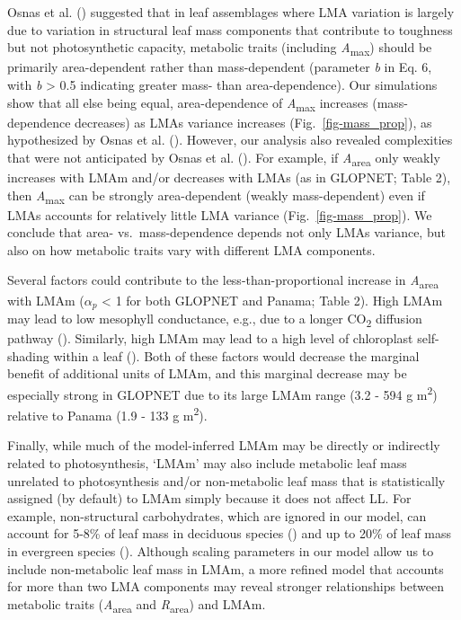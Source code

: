 \documentclass[
  12pt,
  letterpaper,
  DIV=11,
  numbers=noendperiod]{scrartcl}
\begin{document}
Osnas et al. () suggested that in leaf
assemblages where LMA variation is largely due to variation in
structural leaf mass components that contribute to toughness but not
photosynthetic capacity, metabolic traits (including
\emph{A}\textsubscript{max}) should be primarily area-dependent rather
than mass-dependent (parameter \emph{b} in Eq. 6, with \emph{b}
\textgreater{} 0.5 indicating greater mass- than area-dependence). Our
simulations show that all else being equal, area-dependence of
\emph{A}\textsubscript{max} increases (mass-dependence decreases) as
LMAs variance increases (Fig.~\ref{fig-mass_prop}), as hypothesized by
Osnas et al. (). However, our analysis
also revealed complexities that were not anticipated by Osnas et al.
(). For example, if
\emph{A}\textsubscript{area} only weakly increases with LMAm and/or
decreases with LMAs (as in GLOPNET; Table 2), then
\emph{A}\textsubscript{max} can be strongly area-dependent (weakly
mass-dependent) even if LMAs accounts for relatively little LMA variance
(Fig.~\ref{fig-mass_prop}). We conclude that area- vs.~mass-dependence
depends not only LMAs variance, but also on how metabolic traits vary
with different LMA components.

Several factors could contribute to the less-than-proportional increase
in \emph{A}\textsubscript{area} with LMAm (\(\alpha_p\) \textless{} 1
for both GLOPNET and Panama; Table 2). High LMAm may lead to low
mesophyll conductance, e.g., due to a longer CO\textsubscript{2}
diffusion pathway ().
Similarly, high LMAm may lead to a high level of chloroplast
self-shading within a leaf (). Both of these factors would decrease the marginal benefit
of additional units of LMAm, and this marginal decrease may be
especially strong in GLOPNET due to its large LMAm range (3.2 - 594 g
m\textsuperscript{2}) relative to Panama (1.9 - 133 g
m\textsuperscript{2}).

Finally, while much of the model-inferred LMAm may be directly or
indirectly related to photosynthesis, `LMAm' may also include metabolic
leaf mass unrelated to photosynthesis and/or non-metabolic leaf mass
that is statistically assigned (by default) to LMAm simply because it
does not affect LL. For example, non-structural carbohydrates, which are
ignored in our model, can account for 5-8\% of leaf mass in deciduous
species () and up to 20\% of
leaf mass in evergreen species
().
Although scaling parameters in our model allow us to include
non-metabolic leaf mass in LMAm, a more refined model that accounts for
more than two LMA components may reveal stronger relationships between
metabolic traits (\emph{A}\textsubscript{area} and
\emph{R}\textsubscript{area}) and LMAm.
\end{document}
